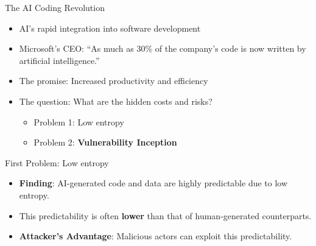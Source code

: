 \documentclass[aspectratio=169]{beamer}
\begin{document}
\begin{frame}{The AI Coding Revolution}
\begin{itemize}
    \item AI's rapid integration into software development
    \item \alert{Microsoft's CEO}: ``As much as 30\% of the company's code is now written by artificial intelligence.''
    \item The promise: Increased productivity and efficiency
    \item The question: What are the hidden costs and risks?
    \begin{itemize}
    \item Problem 1: Low entropy
    \item Problem 2: \textbf{Vulnerability Inception}
    \end{itemize}
\end{itemize}
\end{frame}


\begin{frame}{First Problem: Low entropy}
\begin{center}
\end{center}
\vspace{0.5cm}
\begin{itemize}
    \item \textbf{Finding}: AI-generated code and data are highly predictable due to low entropy.
    \item This predictability is often \textbf{lower} than that of human-generated counterparts.
    \item \textbf{Attacker's Advantage}: Malicious actors can exploit this predictability.
\end{itemize}
\end{frame}
\end{document}
